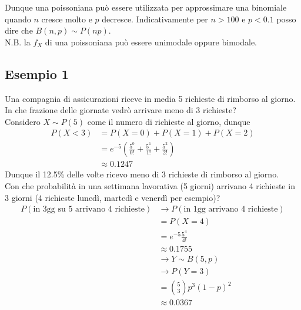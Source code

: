 \documentclass[11pt]{report}
\begin{document}
Dunque una poissoniana può essere utilizzata per approssimare una binomiale quando $n$ cresce molto e $p$ decresce. Indicativamente per $n > 100$ e $p < 0.1$ posso dire che $B(n,p)\sim P(np)$.\\
N.B. la $f_X$ di una poissoniana può essere unimodale oppure bimodale.
\begin{center}
    
\end{center}
\begin{center}
    
\end{center}
\subsection{Esempio 1}
Una compagnia di assicurazioni riceve in media 5 richieste di rimborso al giorno. In che frazione delle giornate vedrò arrivare meno di 3 richieste?\\
Considero $X \sim P(5)$ come il numero di richieste al giorno, dunque
\begin{equation}
    \begin{split}
        P(X < 3) & = P(X=0) + P(X=1) + P(X=2)\\
        & = e^{-5} \left( \frac{5^0}{0!} + \frac{5^1}{1!} + \frac{5^2}{2!} \right)\\
        & \approx 0.1247
    \end{split}
\end{equation}
Dunque il 12.5\% delle volte ricevo meno di 3 richieste di rimborso al giorno.\\
Con che probabilità in una settimana lavorativa (5 giorni) arrivano 4 richieste in 3 giorni (4 richieste lunedì, martedì e venerdì per esempio)?
\begin{equation}
    \begin{split}
       P(\text{in 3gg su 5 arrivano 4 richieste}) & \rightarrow P(\text{in 1gg arrivano 4 richieste})\\
       & = P(X=4)\\
       & = e^{-5} \frac{5^4}{4!}\\
       & \approx 0.1755\\
       & \rightarrow Y \sim B(5,p)\\
       & \rightarrow P(Y=3)\\
       & = \binom{5}{3} p^3 (1-p)^2\\
       & \approx 0.0367
    \end{split}
\end{equation}
\end{document}
